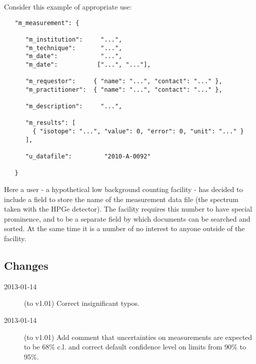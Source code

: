\documentclass[11pt, letterpaper]{article}
\begin{document}
Consider this example of appropriate use:
\begin{small}
\begin{verbatim}
   "m_measurement": {
    
      "m_institution":     "...",
      "m_technique":       "...",
      "m_date":            "...",
      "m_date":           ["...", "..."],
      
      "m_requestor":     { "name": "...", "contact": "..." },
      "m_practitioner":  { "name": "...", "contact": "..." },
               
      "m_description":     "...",
                            
      "m_results": [
        { "isotope": "...", "value": 0, "error": 0, "unit": "..." }
      ],
      
      "u_datafile":         "2010-A-0092"
        
   }
\end{verbatim}
\end{small}
Here a user - a hypothetical low background counting facility - has decided to include a field to store the name of the measurement data file (the spectrum taken with the HPGe detector). The facility requires this number to have special prominence, and to be a separate field by which documents can be searched and sorted. At the same time it is a number of no interest to anyone outside of the facility.

\subsection{Changes} %

\begin{description}
  \item[2013-01-14] (to v1.01) Correct insignificant typos.
  \item[2013-01-14] (to v1.01) Add comment that uncertainties on measurements are expected to be 68\% c.l. and correct default confidence level on limits from 90\% to 95\%.
\end{description}
\end{document}
